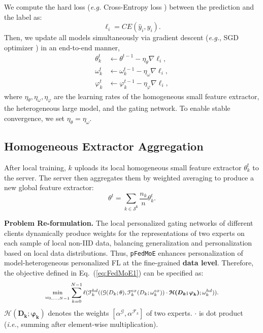 \documentclass[sigconf]{acmart}
\newcommand{\mathcolorbox}[2]{\colorbox{#1}{$ #2$}}
\newcommand{\hetero}{heterogeneous }
\newcommand{\homo}{homogeneous }
\newcommand{\pers}{personalized }
\newcommand{\persN}{personalization }
\newcommand{\genN}{generalization }
\newcommand{\reps}{representations }
\newcommand{\methodname}{{\tt{pFedMoE}}}
\begin{document}
We compute the hard loss (\emph{e.g.} Cross-Entropy loss \citep{CEloss}) between the prediction and the label as:
\begin{equation}
 \ell_i=C E(\hat{y}_i, y_i).   
\end{equation}
Then, we update all models simultaneously via gradient descent (\emph{e.g.}, SGD optimizer \citep{SGD}) in an end-to-end manner,
\begin{equation}
\begin{aligned}
\theta_k^t &\gets \theta^{t-1}-\eta_\theta \nabla \ell_i, \\
\omega_k^t &\gets \omega_k^{t-1}-\eta_\omega \nabla \ell_i, \\
\varphi_k^t &\gets \varphi_k^{t-1}-\eta_{\varphi} \nabla \ell_i,    
\end{aligned}
\end{equation}
where $\eta_\theta,\eta_\omega, \eta_\varphi$ are the learning rates of the \homo small feature extractor, the \hetero  large model, and the gating network. To enable stable convergence, we set $\eta_\theta = \eta_\omega$.

\subsection{Homogeneous Extractor Aggregation}
After local training, $k$ uploads its local \homo small feature extractor $\theta_k^t$ to the server. The server then aggregates them by weighted averaging to produce a new global feature extractor:
\begin{equation}
\theta^t=\sum_{k \in \boldsymbol{\mathcal{S}^t}} \frac{n_k}{n} \theta_k^t. 
\end{equation}

\textbf{Problem Re-formulation.} The local \pers gating networks of different clients dynamically produce weights for the \reps of two experts on each sample of local non-IID data, balancing \genN and \persN based on local data distributions. Thus, \methodname{} enhances \persN of model-\hetero \pers FL at the fine-grained \textbf{data level}. Therefore, the objective defined in Eq.~(\ref{eq:FedMoE1}) can be specified as:
\begin{equation}
\footnotesize
\min_{\omega_{0, \ldots, N-1}} \sum_{k=0}^{N-1} \ell(\mathcal{F}_k^{h d}((\mathcal{G}(D_k ; \theta), \mathcal{F}_k^{ex}(D_k ; \omega_k^{e x})) \cdot \boldsymbol{\mathcal{H}({D}_k ; {\varphi}_k)} ; \omega_k^{h d})).  
\end{equation}
$\boldsymbol{\mathcal{H}({D}_k ; {\varphi}_k)}$ denotes the weights $[\alpha^\mathcal{G},\alpha^{\mathcal{F}_k}]$ of two experts. $\cdot$ is dot product (\emph{i.e.}, summing after element-wise multiplication).
\end{document}
